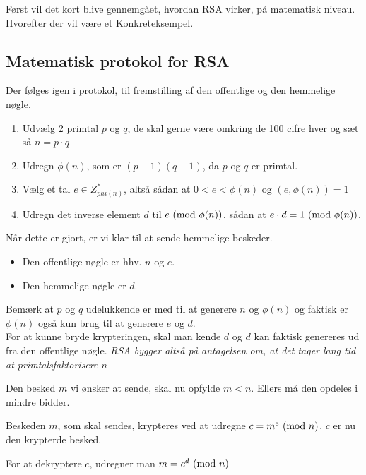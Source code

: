 Først vil det kort blive gennemgået, hvordan RSA virker, på matematisk niveau. Hvorefter der vil være et Konkreteksempel.

\subsection{Matematisk protokol for RSA}\label{rsaprot}
Der følges igen i protokol, til fremstilling af den offentlige og den hemmelige nøgle.

\begin{enumerate}[label*=(\arabic*)] %
    \item Udvælg 2 primtal \(p\) og \(q\), de skal gerne være omkring de 100 cifre hver og sæt så \(n = p \cdot q\)
    \item Udregn \(\phi(n)\), som er \((p - 1) (q - 1)\), da \(p\) og \(q\) er primtal.
    \item Vælg et tal \(e \in Z_{phi(n)}^*\), altså sådan at \(0 < e < \phi(n)\) og \((e, \phi(n)) = 1\)
    \item Udregn det inverse element \(d\) til \(e \ (\mathrm{mod}\ \phi(n))\), sådan at \(e \cdot d = 1 \ (\mathrm{mod}\ \phi(n))\). \label{stepfour}
\end{enumerate}

Når dette er gjort, er vi klar til at sende hemmelige beskeder.

\begin{itemize} %
    \item Den offentlige nøgle er hhv. \(n\) og \(e\).
    \item Den hemmelige nøgle er \(d\).
\end{itemize}

Bemærk at \(p\) og \(q\) udelukkende er med til at generere \(n\) og \(\phi(n)\) og faktisk er \(\phi(n)\) også kun brug til at generere \(e\) og \(d\).\\
For at kunne bryde krypteringen, skal man kende \(d\) og \(d\) kan faktisk genereres ud fra den offentlige nøgle.
\emph{RSA bygger altså på antagelsen om, at det tager lang tid at primtalsfaktorisere \(n\)}
\par

Den besked \(m\) vi ønsker at sende, skal nu opfylde \(m < n\). Ellers må den opdeles i mindre bidder.

Beskeden \(m\), som skal sendes, krypteres ved at udregne \(c = m^e \ (\mathrm{mod}\ n)\). \(c\) er nu den krypterde besked.

For at dekryptere \(c\), udregner man \(m = c^d \ (\mathrm{mod}\ n)\)

